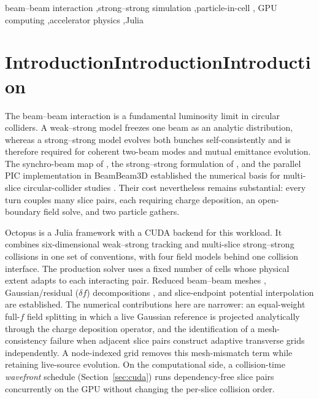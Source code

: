 \documentclass[a4paper,fleqn]{cas-sc}
\begin{document}
\begin{keywords}
beam--beam interaction \sep strong--strong simulation \sep particle-in-cell \sep
GPU computing \sep accelerator physics \sep Julia
\end{keywords}

\maketitle

\makeatletter
\gdef\@pdfauthor{Derong Xu and Yi-Kai Kan}
\gdef\@pdftitle{GPU-accelerated framework for multi-slice strong-strong beam-beam simulation}
\gdef\@pdfsubject{Computer Physics Communications submission}
\makeatother

\section{IntroductionIntroductionIntroduction}
\label{sec:intro}

The beam--beam interaction is a fundamental luminosity limit in circular
colliders.  A weak--strong model freezes one beam as an analytic
distribution, whereas a strong--strong model evolves both bunches
self-consistently and is therefore required for coherent two-beam modes and
mutual emittance evolution.  The synchro-beam map of
\citet{HirataMoshammerRuggiero1993}, the strong--strong formulation of
\citet{Ohmi2000}, and the parallel PIC implementation in BeamBeam3D
\citep{Qiang2004BeamBeam3D,QiangGreen2002} established the numerical basis
for multi-slice circular-collider studies
\citep{OhmiTawadaEtAl2004,Stern2010,HerrPieloni2014,QiangBlaskiewicz2024}.
Their cost nevertheless remains substantial: every turn couples many slice
pairs, each requiring charge deposition, an open-boundary field solve, and
two particle gathers.

Octopus is a Julia \citep{BezansonJulia2017} framework with a CUDA backend
\citep{BesardCUDAjl2019} for this workload.  It combines six-dimensional
weak--strong tracking and multi-slice strong--strong collisions in one set
of conventions, with four field models behind one collision interface.
The production solver uses a fixed number of cells whose physical extent
adapts to each interacting pair.  Reduced beam--beam meshes
\citep{CaiReducedMesh2001}, Gaussian/residual ($\delta f$) decompositions
\citep{KogaTajima1995,CaiDeltaf2000}, and slice-endpoint potential
interpolation \citep{OhmiTawadaOide2003,KabelCai2004} are established.  The
numerical contributions here are narrower: an equal-weight full-$f$ field
splitting in which a live Gaussian reference is projected analytically
through the charge deposition operator, and the identification of a
mesh-consistency failure when adjacent slice pairs construct adaptive
transverse grids independently.  A node-indexed grid removes this
mesh-mismatch term while retaining live-source evolution.  On the
computational side, a collision-time \emph{wavefront} schedule
(Section~\ref{sec:cuda}) runs dependency-free slice pairs concurrently on
the GPU without changing the per-slice collision order.
\end{document}
